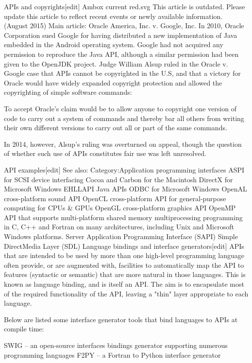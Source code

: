 APIs and copyrights[edit]
Ambox current red.svg
This article is outdated. Please update this article to reflect recent events or newly available information. (August 2015)
Main article: Oracle America, Inc. v. Google, Inc.
In 2010, Oracle Corporation sued Google for having distributed a new implementation of Java embedded in the Android operating system.
 Google had not acquired any permission to reproduce the Java API, although a similar permission had been given to the OpenJDK project. 
 Judge William Alsup ruled in the Oracle v. Google case that APIs cannot be copyrighted in the U.S, and that a victory for Oracle would have widely expanded copyright protection and allowed the copyrighting of simple software commands:

To accept Oracle's claim would be to allow anyone to copyright one version of code to carry out a system of commands and thereby bar all others from writing their own different versions to carry out all or part of the same commands.

In 2014, however, Alsup's ruling was overturned on appeal, though the question of whether such use of APIs constitutes fair use was left unresolved.

API examples[edit]
See also: Category:Application programming interfaces
ASPI for SCSI device interfacing
Cocoa and Carbon for the Macintosh
DirectX for Microsoft Windows
EHLLAPI
Java APIs
ODBC for Microsoft Windows
OpenAL cross-platform sound API
OpenCL cross-platform API for general-purpose computing for CPUs & GPUs
OpenGL cross-platform graphics API
OpenMP API that supports multi-platform shared memory multiprocessing programming in C, C++ and Fortran on many architectures, including Unix and Microsoft Windows platforms.
Server Application Programming Interface (SAPI)
Simple DirectMedia Layer (SDL)
Language bindings and interface generators[edit]
APIs that are intended to be used by more than one high-level programming language often provide, or are augmented with, facilities to automatically map the API to features (syntactic or semantic) that are more natural in those languages. 
This is known as language binding, and is itself an API. The aim is to encapsulate most of the required functionality of the API, leaving a "thin" layer appropriate to each language.

Below are listed some interface generator tools that bind languages to APIs at compile time:

SWIG – an open-source interfaces bindings generator supporting numerous programming languages
F2PY – a Fortran to Python interface generator
\newpage %